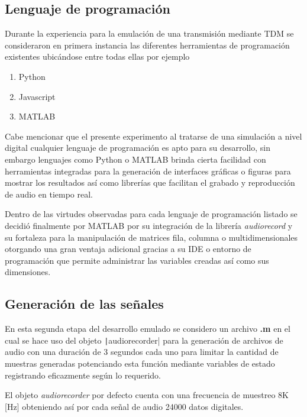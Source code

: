 \documentclass[conference]{IEEEtran}
\begin{document}
	\subsection{Lenguaje de programación}
	Durante la experiencia para la emulación de una transmisión mediante TDM se consideraron en primera instancia las diferentes herramientas de programación existentes ubicándose entre todas ellas por ejemplo 
	
	\begin{enumerate}
		\item Python
		\item Javascript
		\item MATLAB
	\end{enumerate}
	
	Cabe mencionar que el presente experimento al tratarse de una simulación a nivel digital cualquier lenguaje de programación es apto para su desarrollo, sin embargo lenguajes como Python o MATLAB brinda cierta facilidad con herramientas integradas para la generación de interfaces gráficas o figuras para mostrar los resultados así como librerías que facilitan el grabado y reproducción de audio en tiempo real.
	
	Dentro de las virtudes observadas para cada lenguaje de programación listado se decidió finalmente por MATLAB por su integración de la librería \textit{audiorecord} y su fortaleza para la manipulación de matrices fila, columna o multidimensionales otorgando una gran ventaja adicional gracias a su IDE o entorno de programación que permite administrar las variables creadas así como sus dimensiones.
	
	\subsection{Generación de las señales}
	
	En esta segunda etapa del desarrollo emulado se considero un archivo \textbf{.m} en el cual se hace uso del objeto \texttt|audiorecorder| para la generación de archivos de audio con una duración de 3 segundos cada uno para limitar la cantidad de muestras generadas potenciando esta función mediante variables de estado registrando eficazmente según lo requerido.
	
	El objeto \textit{audiorecorder} por defecto cuenta con una frecuencia de muestreo 8K [Hz] obteniendo así por cada señal de audio 24000 datos digitales.
	
\end{document}
